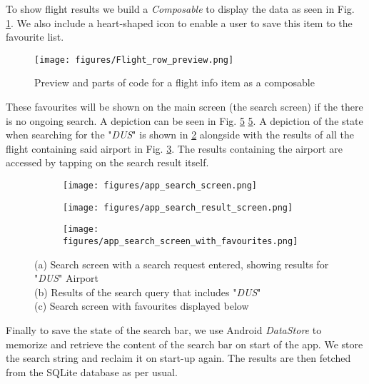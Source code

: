 To show flight results we build a \textsl{Composable} to display the data as seen in Fig. \ref{fig:composable_preview}. 
We also include a heart-shaped icon to enable a user to save this item to the favourite list.
\begin{figure}
	\texttt{[image: figures/Flight\_row\_preview.png]}
	\caption{Preview and parts of code for a flight info item as a composable}
	\label{fig:composable_preview}
\end{figure}
These favourites will be shown on the main screen (the search screen) if the there is no ongoing search. A depiction can be seen in Fig. \ref{fig:search_screen_w_fav} \ref{fig:search_screen_w_fav}.
A depiction of the state when searching for the "\textsl{DUS}" is shown in \ref{fig:search_screen} alongside with the results of all the flight containing said airport in Fig. \ref{fig:result_screen}. The results containing the airport are accessed by tapping on the search result itself.
\begin{figure}
	\centering
	\begin{subfigure}{.28\linewidth}
		\centering
		\texttt{[image: figures/app\_search\_screen.png]}
		\caption{}
		\label{fig:search_screen}
	\end{subfigure}
	\begin{subfigure}{.28\linewidth}
		\centering
		\texttt{[image: figures/app\_search\_result\_screen.png]}
		\caption{}
		\label{fig:result_screen}
	\end{subfigure}
	\begin{subfigure}{.28\linewidth}
		\centering
		\texttt{[image: figures/app\_search\_screen\_with\_favourites.png]}
		\caption{}
		\label{fig:search_screen_w_fav}
	\end{subfigure}
	\caption{(a) Search screen with a search request entered, showing results for "\textsl{DUS}" Airport\\
		(b) Results of the search query that includes "\textsl{DUS}"\\
		(c) Search screen with favourites displayed below}
\end{figure}

Finally to save the state of the search bar, we use Android \textsl{DataStore} to memorize and retrieve the content of the search bar on start of the app. 
We store the search string and reclaim it on start-up again. The results are then fetched from the SQLite database as per usual. 


